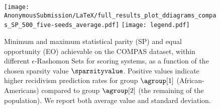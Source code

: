 \begin{figure}[!ht]
  \centering
  \texttt{[image: AnonymousSubmission/LaTeX/full\_results\_plot\_ddiagrams\_compas\_SP\_500\_five-seeds\_average.pdf]}
\texttt{[image: legend.pdf]}
\caption{Minimum and maximum statistical parity (SP) and equal opportunity (EO) achievable on the COMPAS dataset, within different $\epsilon$-Rashomon Sets for scoring systems, as a function of the chosen sparsity value $\sparsityvalue$. Positive values indicate higher recidivism prediction rates for group $\agroup[1]$ (African-Americans) compared to group $\agroup[2]$ (the remaining of the population). We report both average value and standard deviation.}
\label{fig:effect5}
\end{figure}